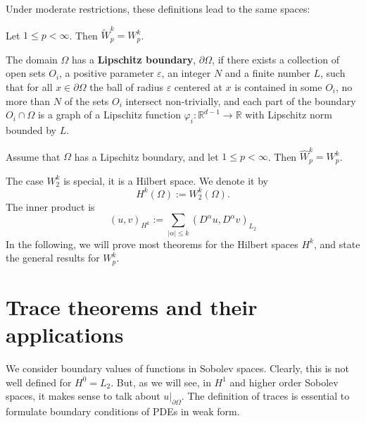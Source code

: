 Under moderate restrictions, these definitions lead to the same spaces:
\begin{theorem} Let $1 \leq p < \infty$. Then $\widetilde W_p^k  = W_p^k$.
\end{theorem}

\begin{definition} The domain $\Omega$ has a {\bf Lipschitz boundary}, $\partial \Omega$, if there exists a collection of open sets $O_i$, a positive parameter $\varepsilon$, an integer $N$ and a finite number $L$, such that for all $x \in \partial \Omega$ the ball of radius $\varepsilon$ centered at $x$ is contained in some $O_i$, no more than $N$ of the sets $O_i$ intersect non-trivially, and each 
part of the boundary $O_i \cap \Omega$ is a graph of a Lipschitz function $\varphi_i : {\mathbb R}^{d-1} \rightarrow {\mathbb R}$ with Lipschitz norm bounded by $L$.
\end{definition}

\begin{theorem} Assume that $\Omega$ has a Lipschitz boundary, and let $1 \leq p < \infty$. Then  $\widehat W_p^k  = W_p^k$.
\end{theorem}


The case $W_2^k$ is special, it is a Hilbert space. We denote it by
$$
H^k(\Omega) := W_2^k(\Omega).
$$
The inner product is 
$$
(u,v)_{H^k} := \sum_{|\alpha| \leq k} (D^\alpha u, D^\alpha v)_{L_2}
$$
In the following, we will prove most theorems for the Hilbert spaces $H^k$,
and state the general results for $W_p^k$.












\section{Trace theorems and their applications}
We consider boundary values of functions in Sobolev spaces. Clearly,
this is not well defined for $H^0 = L_2$. But, as we will see, in
$H^1$ and higher order Sobolev spaces, it makes sense to talk about $u
|_{\partial \Omega}$. The definition of traces is essential to
formulate boundary conditions of PDEs in weak form.


